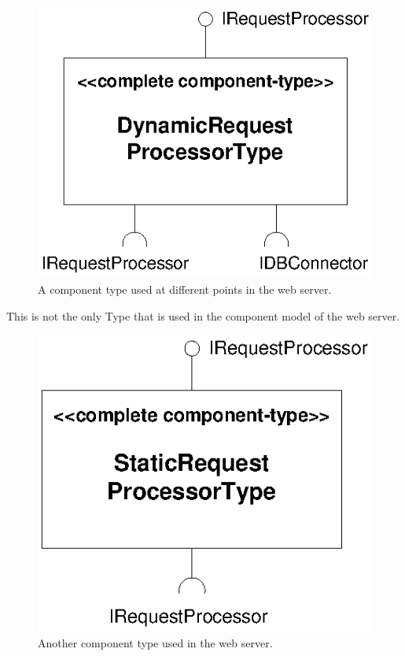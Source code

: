 \begin{figure}
\centering
\includegraphics[scale=1.0]{example/DynamicRequestProcessorType}
\caption{A component type used at different points in the web server.}
\label{fig:DynamicRequestProcessorType}
\end{figure}

This is not the only Type that is used in the component model of the web server.

\begin{figure}
\centering
\includegraphics[scale=1.0]{example/RequestProcessorType}
\caption{Another component type used in the web server.}
\label{fig:RequestProcessorType}
\end{figure}

